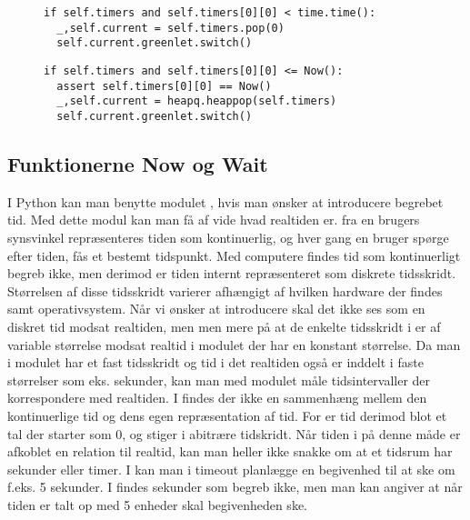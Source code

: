 \begin{figure}[hbtp]
\begin{minipage}[c]{\linewidth}
\begin{lstlisting}[firstnumber=204, label=sched_timer, caption=Udvælgelse af proces fra listen timers (fra scheduling.py)]
if self.timers and self.timers[0][0] < time.time():
  _,self.current = self.timers.pop(0)
  self.current.greenlet.switch()
\end{lstlisting}
\end{minipage}
\begin{minipage}[c]{\linewidth}
\begin{lstlisting}[firstnumber=124, label=sim_timer, caption=Udvælgelse af proces fra listen timers (fra simulation.py)]
if self.timers and self.timers[0][0] <= Now():
  assert self.timers[0][0] == Now()
  _,self.current = heapq.heappop(self.timers)
  self.current.greenlet.switch()
\end{lstlisting}
\end{minipage}
\end{figure}

\subsection{Funktionerne Now og Wait}
 I Python kan man benytte modulet 
, hvis man ønsker at introducere begrebet tid. Med dette
modul kan man få af vide hvad realtiden er. fra en brugers synsvinkel
repræsenteres tiden som kontinuerlig, og hver gang en bruger spørge
efter tiden, fås et bestemt tidspunkt. Med computere findes tid som
kontinuerligt begreb ikke, men derimod er tiden internt repræsenteret
som diskrete tidsskridt. Størrelsen af disse tidsskridt varierer
afhængigt af hvilken hardware der findes samt operativsystem.
Når vi ønsker at introducere \des skal det ikke ses som en diskret
tid modsat realtiden, men men mere på at de enkelte tidsskridt i \des er af
variable størrelse modsat  realtid i  modulet  der har en konstant
størrelse. Da man i  modulet har et fast tidsskridt og
tid i det realtiden også er inddelt i faste størrelser
som eks. sekunder, kan man med  modulet måle tidsintervaller der
korrespondere med realtiden. I \des findes der ikke en
sammenhæng mellem den kontinuerlige tid og dens egen repræsentation af
tid. For \des er tid derimod blot et tal der starter som 0, og stiger
i abitrære tidskridt. Når tiden i \des på denne måde er afkoblet
en relation til realtid, kan man heller ikke snakke om at et tidsrum
har sekunder eller timer. I \pycsp kan man i timeout planlægge en
begivenhed til at ske om f.eks. 5 sekunder. I \des findes sekunder som
begreb ikke, men man kan angiver at når tiden  er talt op med 5 enheder skal
begivenheden ske. 

